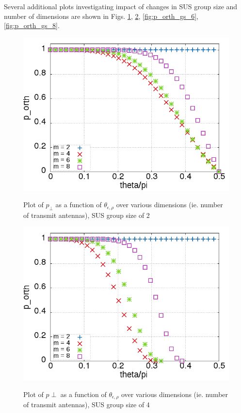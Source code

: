 Several additional plots investigating impact of changes in SUS group size and number of dimensions are shown in Figs. \ref{fig:p_orth_gs_2}, \ref{fig:p_orth_gs_4}, \ref{fig:p_orth_gs_6}, \ref{fig:p_orth_gs_8}.

\begin{figure}
    \includegraphics[width=12cm]{figs/p_orth_gs_2.png}\\
    \caption{Plot of $p_{\perp}$ as a function of $\theta_{\epsilon,\rho}$ over various dimensions (ie. number of transmit antennas), SUS group size of 2}
    \label{fig:p_orth_gs_2}
\end{figure}

\begin{figure}
    \includegraphics[width=12cm]{figs/p_orth_gs_4.png}\\
    \caption{Plot of $p{\perp}$ as a function of $\theta_{\epsilon,\rho}$ over various dimensions (ie. number of transmit antennas), SUS group size of 4}
    \label{fig:p_orth_gs_4}
\end{figure}

